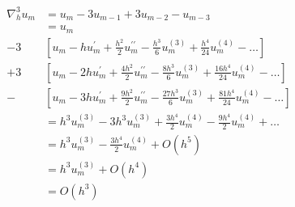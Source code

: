 \begin{align*}
  \nabla_h^3 u_m & = u_m - 3u_{m-1} + 3u_{m-2} - u_{m-3}                                                                                                    \\
                 & = u_m                                                                                                                                    \\
  - 3            & \left[u_m - h u_m^{\prime} + \frac{h^2}{2} u_m^{\prime\prime} - \frac{h^3}{6} u_m^{(3)} + \frac{h^4}{24} u_m^{(4)} - \hdots\right]       \\
  + 3            & \left[u_m - 2h u_m^{\prime} + \frac{4h^2}{2} u_m^{\prime\prime} - \frac{8h^3}{6} u_m^{(3)} + \frac{16h^4}{24} u_m^{(4)} - \hdots\right]  \\
  -              & \left[u_m - 3h u_m^{\prime} + \frac{9h^2}{2} u_m^{\prime\prime} - \frac{27h^3}{6} u_m^{(3)} + \frac{81h^4}{24} u_m^{(4)} - \hdots\right] \\
                 & = h^3 u_m^{(3)} - 3h^3 u_m^{(3)} + \frac{3h^4}{2} u_m^{(4)} - \frac{9h^4}{2} u_m^{(4)} + \hdots                                          \\
                 & = h^3 u_m^{(3)} - \frac{3h^4}{2} u_m^{(4)} + O(h^5)                                                                                      \\
                 & = h^3 u_m^{(3)} + O(h^4)                                                                                                                 \\
                 & = O(h^3)
\end{align*}

